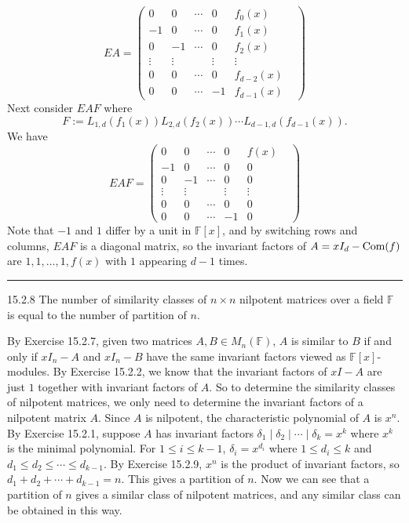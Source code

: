 \documentclass[a4paper, 12pt]{article}
\begin{document}
\begin{solution}
\[EA=\begin{pmatrix}
	0&0&\cdots&0&f_0(x)\\ 
	-1&0&\cdots&0&f_1(x)\\ 
	0&-1&\cdots&0&f_2(x)\\ 
	\vdots&\vdots&&\vdots&\vdots&\\ 
	0&0&\cdots&0&f_{d-2}(x)\\ 
	0&0&\cdots&-1&f_{d-1}(x)
\end{pmatrix}\]
Next consider \(EAF\) where 
\[F:=L_{1,d}(f_1(x))L_{2,d}(f_2(x))\cdots L_{d-1,d}(f_{d-1}(x)).\]
We have 
\[EAF=\begin{pmatrix}
	0&0&\cdots&0&f(x)\\ 
	-1&0&\cdots&0&0\\ 
	0&-1&\cdots&0&0\\ 
	\vdots&\vdots&&\vdots&\vdots&\\ 
	0&0&\cdots&0&0\\ 
	0&0&\cdots&-1&0
\end{pmatrix}\]
Note that \(-1\) and \(1\) differ by a unit in \(\mathbb{F}[x]\), and by switching rows and columns, \(EAF\) is a diagonal matrix, so the invariant factors of \(A=xI_d-\text{Com}(f)\) are 
\(1,1,\ldots,1,f(x)\) with \(1\) appearing \(d-1\) times.
\end{solution}

\noindent\rule{7in}{2.8pt}
\begin{problem}{15.2.8}
The number of similarity classes of \(n\times n\) nilpotent matrices over a field \(\mathbb{F}\) is equal to the number of partition of \(n\).
\end{problem}
\begin{solution}
By Exercise 15.2.7, given two matrices \(A,B\in M_n(\mathbb{F})\), \(A\) is similar to \(B\) if and only if \(xI_n-A\) and \(xI_n-B\) have the same 
invariant factors viewed as \(\mathbb{F}[x]\)-modules. By Exercise 15.2.2, we know that the invariant factors of \(xI-A\) are just \(1\) together with invariant factors of \(A\). So to determine the similarity classes of nilpotent matrices, we only need to determine the invariant factors of a nilpotent matrix \(A\). Since \(A\) is nilpotent, the characteristic polynomial of \(A\) is \(x^n\). By Exercise 15.2.1, suppose \(A\) has invariant factors \(\delta_1\mid \delta_2\mid \cdots \mid \delta_k=x^k\) where \(x^k\) is the minimal polynomial. 
For \(1\leq i\leq k-1\), \(\delta_i=x^{d_i}\) where \(1\leq d_i\leq k\) and \(d_1\leq  d_2\leq \cdots\leq d_{k-1}\). By Exercise 15.2.9, \(x^n\) is the product of invariant factors, so \(d_1+d_2+\cdots+d_{k-1}=n\). This gives a partition of \(n\). Now we can see that 
a partition of \(n\) gives a similar class of nilpotent matrices, and any similar class can be obtained in this way.
\end{solution}
\end{document}
